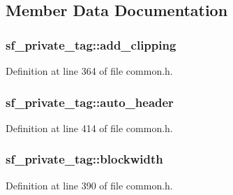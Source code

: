 \subsection{Member Data Documentation}
\subsubsection[{\texorpdfstring{add\+\_\+clipping}{add_clipping}}]{ sf\+\_\+private\+\_\+tag\+::add\+\_\+clipping}\hypertarget{structsf__private__tag_a64ec0e35dca1d2aff27683cf0467c879}{}\label{structsf__private__tag_a64ec0e35dca1d2aff27683cf0467c879}


Definition at line 364 of file common.\+h.

\subsubsection[{\texorpdfstring{auto\+\_\+header}{auto_header}}]{ sf\+\_\+private\+\_\+tag\+::auto\+\_\+header}\hypertarget{structsf__private__tag_a51866b37193b4c03c2007a5e1be6b692}{}\label{structsf__private__tag_a51866b37193b4c03c2007a5e1be6b692}


Definition at line 414 of file common.\+h.

\subsubsection[{\texorpdfstring{blockwidth}{blockwidth}}]{ sf\+\_\+private\+\_\+tag\+::blockwidth}\hypertarget{structsf__private__tag_a4216875ecce622f520ef19f87aee3400}{}\label{structsf__private__tag_a4216875ecce622f520ef19f87aee3400}


Definition at line 390 of file common.\+h.

